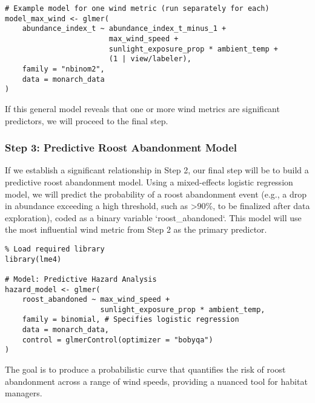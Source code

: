 \begin{verbatim}
# Example model for one wind metric (run separately for each)
model_max_wind <- glmer(
    abundance_index_t ~ abundance_index_t_minus_1 + 
                        max_wind_speed + 
                        sunlight_exposure_prop * ambient_temp +
                        (1 | view/labeler),
    family = "nbinom2",
    data = monarch_data
)
\end{verbatim}

If this general model reveals that one or more wind metrics are significant predictors, we will proceed to the final step.

\subsubsection{Step 3: Predictive Roost Abandonment Model}

If we establish a significant relationship in Step 2, our final step will be to build a predictive roost abandonment model. Using a mixed-effects logistic regression model, we will predict the probability of a roost abandonment event (e.g., a drop in abundance exceeding a high threshold, such as >90\%, to be finalized after data exploration), coded as a binary variable `roost_abandoned`. This model will use the most influential wind metric from Step 2 as the primary predictor.

\begin{verbatim}
% Load required library
library(lme4)

# Model: Predictive Hazard Analysis
hazard_model <- glmer(
    roost_abandoned ~ max_wind_speed + 
                      sunlight_exposure_prop * ambient_temp,
    family = binomial, # Specifies logistic regression
    data = monarch_data,
    control = glmerControl(optimizer = "bobyqa")
)
\end{verbatim}

The goal is to produce a probabilistic curve that quantifies the risk of roost abandonment across a range of wind speeds, providing a nuanced tool for habitat managers.
